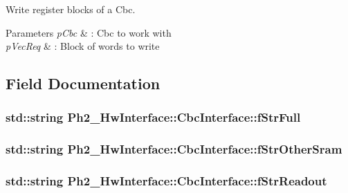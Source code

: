 Write register blocks of a Cbc. 


\begin{DoxyParams}{Parameters}
{\em p\-Cbc} & \-: Cbc to work with \\
\hline
{\em p\-Vec\-Req} & \-: Block of words to write \\
\hline
\end{DoxyParams}


\subsection{Field Documentation}
\hypertarget{class_ph2___hw_interface_1_1_cbc_interface_a72fbeb3befe9e533fc21cc568e540df4}{
\subsubsection[{f\-Str\-Full}]{\setlength{\rightskip}{0pt plus 5cm}std\-::string Ph2\-\_\-\-Hw\-Interface\-::\-Cbc\-Interface\-::f\-Str\-Full\hspace{0.3cm}{\ttfamily [private]}}}\label{class_ph2___hw_interface_1_1_cbc_interface_a72fbeb3befe9e533fc21cc568e540df4}
\hypertarget{class_ph2___hw_interface_1_1_cbc_interface_a3277ad84e5806e7992563dbb6122fdb9}{
\subsubsection[{f\-Str\-Other\-Sram}]{\setlength{\rightskip}{0pt plus 5cm}std\-::string Ph2\-\_\-\-Hw\-Interface\-::\-Cbc\-Interface\-::f\-Str\-Other\-Sram\hspace{0.3cm}{\ttfamily [private]}}}\label{class_ph2___hw_interface_1_1_cbc_interface_a3277ad84e5806e7992563dbb6122fdb9}
\hypertarget{class_ph2___hw_interface_1_1_cbc_interface_ade4f2642613500ee5f1963c22509c48b}{
\subsubsection[{f\-Str\-Readout}]{\setlength{\rightskip}{0pt plus 5cm}std\-::string Ph2\-\_\-\-Hw\-Interface\-::\-Cbc\-Interface\-::f\-Str\-Readout\hspace{0.3cm}{\ttfamily [private]}}}\label{class_ph2___hw_interface_1_1_cbc_interface_ade4f2642613500ee5f1963c22509c48b}
